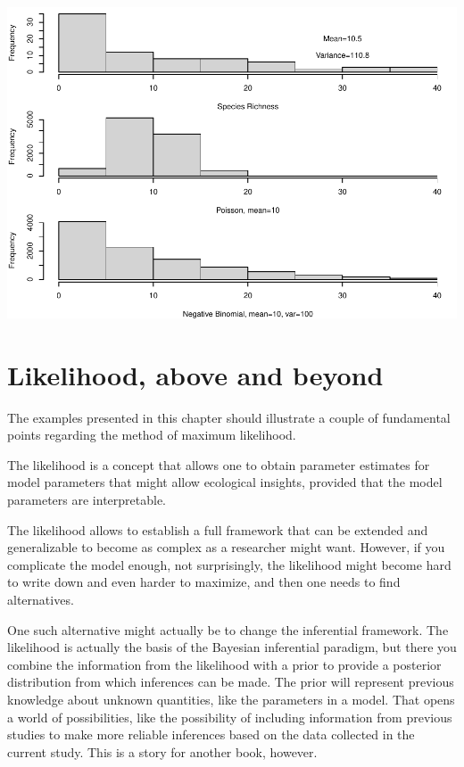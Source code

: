 \documentclass[
]{book}
\begin{document}
\includegraphics{ECOMODbook_files/figure-latex/unnamed-chunk-27-1.pdf}

\hypertarget{likelihood-above-and-beyond}{%
\section{Likelihood, above and beyond}\label{likelihood-above-and-beyond}}

The examples presented in this chapter should illustrate a couple of fundamental points regarding the method of maximum likelihood.

The likelihood is a concept that allows one to obtain parameter estimates for model parameters that might allow ecological insights, provided that the model parameters are interpretable.

The likelihood allows to establish a full framework that can be extended and generalizable to become as complex as a researcher might want. However, if you complicate the model enough, not surprisingly, the likelihood might become hard to write down and even harder to maximize, and then one needs to find alternatives.

One such alternative might actually be to change the inferential framework. The likelihood is actually the basis of the Bayesian inferential paradigm, but there you combine the information from the likelihood with a prior to provide a posterior distribution from which inferences can be made. The prior will represent previous knowledge about unknown quantities, like the parameters in a model. That opens a world of possibilities, like the possibility of including information from previous studies to make more reliable inferences based on the data collected in the current study. This is a story for another book, however.
\end{document}
